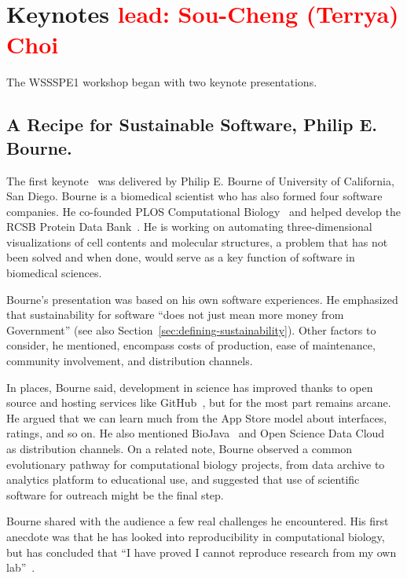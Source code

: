 \documentclass[11pt, oneside]{amsart}
\newcommand{\note}[1]{ {\textcolor{red}    { #1 }}}
\begin{document}
\section{Keynotes \note{lead: Sou-Cheng (Terrya) Choi}} \label{sec:keynotes}

The WSSSPE1 workshop began with two keynote presentations.

\subsection{A Recipe for Sustainable Software, Philip E. Bourne.} \label{sec:keynote1}

The first keynote~\cite{WSSSPE1-keynote1} was delivered by Philip
E. Bourne of University of California, San Diego.  Bourne is a 
biomedical scientist who has also formed four software companies. He co-founded
PLOS Computational Biology~\cite{plos-web} and helped develop the RCSB
Protein Data Bank~\cite{pdb-web}.
He is working on automating three-dimensional visualizations of cell
contents and molecular structures, a problem that has not been solved
and when done, would serve as a key function of software in biomedical
sciences.

Bourne's  presentation was based on his own software experiences.  He emphasized that
sustainability for software ``does not just mean more money from
Government'' (see also Section~\ref{sec:defining-sustainability}).  Other
factors to consider, he mentioned, encompass costs of production, ease
of maintenance, community involvement, and distribution channels.

In places, Bourne said, development in science has improved thanks to
open source and hosting services like GitHub~\cite{github-web}, but for the most part
remains arcane. He argued that we can learn much from the App Store
model about interfaces, ratings, and so on. He also mentioned
BioJava~\cite{biojava-web} and Open Science Data Cloud~\cite{osdc-web}
as distribution channels.  On a related note, Bourne observed a common
evolutionary pathway for computational biology projects, from data
archive to analytics platform to educational use, and suggested that
use of scientific software for outreach might be the final step.

Bourne shared with the audience a few real challenges he
encountered. His first anecdote was that he has looked into
reproducibility in computational biology, but has concluded that ``I
have proved I cannot reproduce research from my own
lab''~\cite{Veretnik}.
\end{document}
